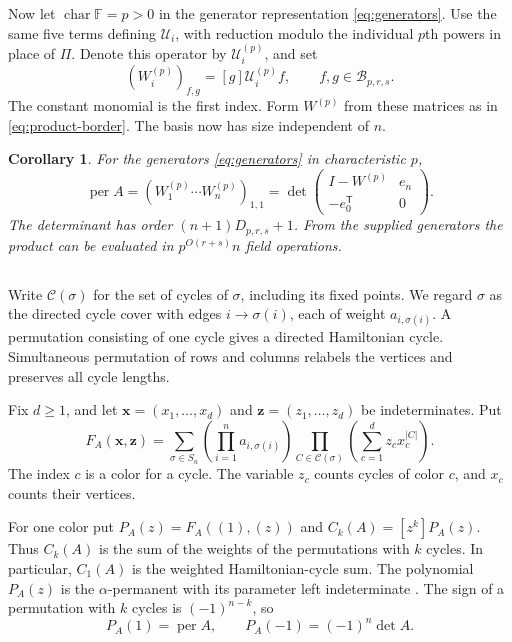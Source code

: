 \documentclass[11pt,reqno]{amsart}
\newtheorem{corollary}[theorem]{Corollary}
\theoremstyle{remark}
\numberwithin{equation}{section}
\newcommand{\per}{\operatorname{per}}
\newcommand{\F}{\mathbb F}
\begin{document}
Now let \(\operatorname{char}\F=p>0\) in the generator
representation \eqref{eq:generators}. Use the same five terms
defining \(\mathcal U_i\), with reduction modulo the individual
\(p\)th powers in place of \(\Pi\). Denote this operator by
\(\mathcal U_i^{(p)}\), and set
\[
 (W_i^{(p)})_{f,g}=[g]\mathcal U_i^{(p)}f,
             \qquad f,g\in\mathcal B_{p,r,s}.
\]
The constant monomial is the first index. Form \(W^{(p)}\)
from these matrices as in \eqref{eq:product-border}.
The basis now has size independent of \(n\).

\begin{corollary}\label{cor:positive-ordered}
For the generators \eqref{eq:generators} in characteristic \(p\),
\begin{equation}\label{eq:positive-ordered}
 \per A=(W_1^{(p)}\cdots W_n^{(p)})_{1,1}
 =\det\begin{pmatrix}I-W^{(p)}&e_n\\-e_0^{\mathsf T}&0\end{pmatrix}.
\end{equation}
The determinant has order \((n+1)D_{p,r,s}+1\). From the supplied
generators the product can be evaluated in
\(p^{O(r+s)}n\) field operations.
\end{corollary}

\subsection{}

Write \(\mathcal C(\sigma)\) for the set of cycles of \(\sigma\),
including its fixed points. We regard \(\sigma\) as the directed
cycle cover with edges \(i\to\sigma(i)\), each of weight \(a_{i,\sigma(i)}\).
A permutation consisting of one cycle gives a directed Hamiltonian
cycle. Simultaneous permutation of rows and columns relabels the
vertices and preserves all cycle lengths.

Fix \(d\geq1\), and let \(\boldsymbol x=(x_1,\ldots,x_d)\) and
\(\boldsymbol z=(z_1,\ldots,z_d)\) be indeterminates. Put
\begin{equation}\label{eq:cycle-colors}
 F_A(\boldsymbol x,\boldsymbol z)
 =\sum_{\sigma\in S_n}\left(\prod_{i=1}^n a_{i,\sigma(i)}\right)
   \prod_{C\in\mathcal C(\sigma)}
       \left(\sum_{c=1}^d z_c x_c^{|C|}\right).
\end{equation}
The index \(c\) is a color for a cycle. The variable \(z_c\)
counts cycles of color \(c\), and \(x_c\) counts their vertices.

For one color put \(P_A(z)=F_A((1),(z))\) and \(C_k(A)=[z^k]P_A(z)\).
Thus \(C_k(A)\) is the sum of the weights of the permutations
with \(k\) cycles. In particular, \(C_1(A)\) is the weighted
Hamiltonian-cycle sum. The polynomial \(P_A(z)\) is the
\(\alpha\)-permanent with its parameter left indeterminate
\cite{VereJones}. The sign of a permutation with \(k\) cycles
is \((-1)^{n-k}\), so
\begin{equation}\label{eq:cycle-specializations}
 P_A(1)=\per A,\qquad P_A(-1)=(-1)^n\det A.
\end{equation}
\end{document}
